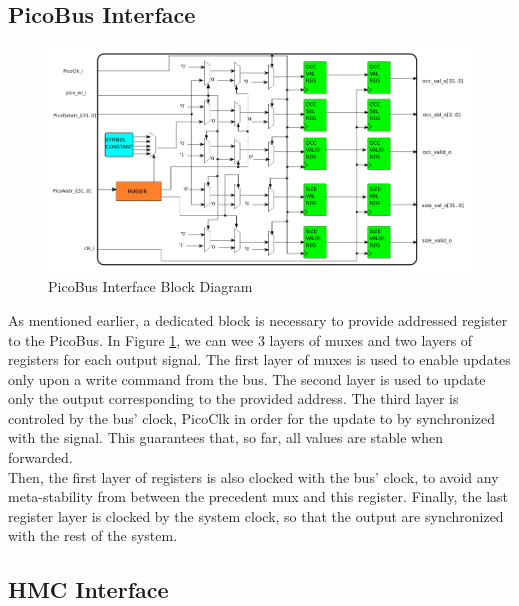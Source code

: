 \subsection{PicoBus Interface}
\begin{figure}[H]
    \centering
    \hspace*{-20mm}\includegraphics[scale = 0.5]{Figures/REG_DIAG.png}
    \caption{PicoBus Interface Block Diagram}
    \label{fig:REG_DIAG}
\end{figure}

As mentioned earlier, a dedicated block is necessary to provide addressed register to the PicoBus. In Figure \ref{fig:REG_DIAG}, we can wee 3 layers of muxes and two layers of registers for each output signal. The first layer of muxes is used to enable updates only upon a write command from the bus. The second layer is used to update only the output corresponding to the provided address. The third layer is controled by the bus' clock, PicoClk in order for the update to by synchronized with the signal. This guarantees that, so far, all values are stable when forwarded. \\
Then, the first layer of registers is also clocked with the bus' clock, to avoid any meta-stability from between the precedent mux and this register. Finally, the last register layer is clocked by the system clock, so that the output are synchronized with the rest of the system. \\


\subsection{HMC Interface}

